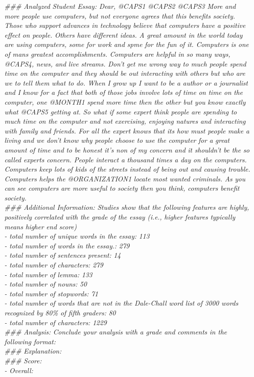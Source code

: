 \textit{
\#\#\# Analyzed Student Essay: Dear, @CAPS1 @CAPS2 @CAPS3 More and more people use computers, but not everyone agrees that this benefits society. Those who support advances in technology believe that computers have a positive effect on people. Others have different ideas. A great amount in the world today are using computers, some for work and spme for the fun of it. Computers is one of mans greatest accomplishments. Computers are helpful in so many ways, @CAPS4, news, and live streams. Don't get me wrong way to much people spend time on the computer and they should be out interacting with others but who are we to tell them what to do. When I grow up I want to be a author or a journalist and I know for a fact that both of those jobs involve lots of time on time on the computer, one @MONTH1 spend more time then the other but you know exactly what @CAPS5 getting at. So what if some expert think people are spending to much time on the computer and not exercising, enjoying natures and interacting with family and friends. For all the expert knows that its how must people make a living and we don't know why people choose to use the computer for a great amount of time and to be honest it's non of my concern and it shouldn't be the so called experts concern. People interact a thousand times a day on the computers. Computers keep lots of kids of the streets instead of being out and causing trouble. Computers helps the @ORGANIZATION1 locate most wanted criminals. As you can see computers are more useful to society then you think, computers benefit society. \\
}
\textit{
\#\#\# Additional Information: Studies show that the following features are highly, positively correlated with the grade of the essay (i.e., higher features typically means higher end score)  \\
- total number of unique words in the essay: 113  \\
- total number of words in the essay.: 279  \\
- total number of sentences present: 14  \\
- total number of characters: 279  \\
- total number of lemma: 133  \\
- total number of nouns: 50  \\
- total number of stopwords: 71  \\
- total number of words that are not in the Dale-Chall word list of 3000 words recognized by 80\% of fifth graders: 80  \\
- total number of characters: 1229  \\
}
\textit{
\#\#\# Analysis: Conclude your analysis with a grade and comments in the following format:  \\
\#\#\# Explanation:  \\
\#\#\# Score: \\
- Overall:
}
